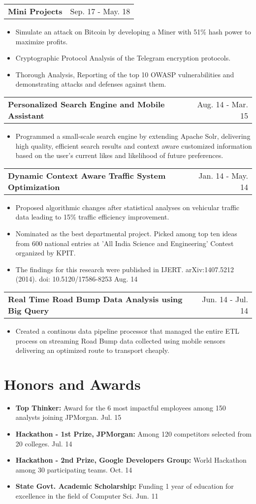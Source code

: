 \documentclass[a4paper,10pt]{article}
\makeatletter
\newcommand{\projectHeading}[2]{
    \begin{tabular*}{1\textwidth}{l@{\extracolsep{\fill}}r}
      \large{\textbf{#1}} & \small{#2} 
    \end{tabular*}
}
\newcommand{\resumeItemListStart}{\begin{itemize}[topsep=2.2pt, parsep=1pt, listparindent=0pt, itemindent=0pt, itemsep=1pt, leftmargin=*]}
\newcommand{\resumeItemListEnd}{\end{itemize}}
\makeatother
\begin{document}
    \projectHeading{Mini Projects}{Sep. 17 - May. 18} 
    \resumeItemListStart
    	 \item\small{Simulate an attack on Bitcoin by developing a Miner with 51\% hash power to maximize profits.}
    	 \item\small{Cryptographic Protocol Analysis of the Telegram encryption protocols.}
    	 \item\small{Thorough Analysis, Reporting of the top 10 OWASP vulnerabilities and demonstrating attacks and defenses against them.}
    \resumeItemListEnd
    
   \projectHeading{Personalized Search Engine and Mobile Assistant}{Aug. 14 - Mar. 15} 
    \resumeItemListStart
       \item\small{Programmed a small-scale search engine by extending Apache Solr, delivering high quality, efficient search results and context aware customized information based on the user's current likes and likelihood of future preferences.}
     \resumeItemListEnd
   
   \projectHeading{Dynamic Context Aware Traffic System Optimization}{Jan. 14 - May. 14} 
    \resumeItemListStart
       \item\small{Proposed algorithmic changes after statistical analyses on vehicular traffic data leading to 15\% traffic efficiency improvement.}
       \item\small{Nominated as the best departmental project. Picked among top ten ideas from 600 national entries at 'All India Science and Engineering' Contest organized by KPIT.}
       \item\small{The findings for this research were published in IJERT. arXiv:1407.5212 (2014). doi: 10.5120/17586-8253 Aug. 14}
     \resumeItemListEnd

   \projectHeading{Real Time Road Bump Data Analysis using Big Query}{Jun. 14 - Jul. 14} 
   \resumeItemListStart
      \item\small{Created a continous data pipeline processor that managed the entire ETL process on streaming Road Bump data collected using mobile sensors delivering an optimized route to transport cheaply.}
   \resumeItemListEnd
   
 
\section{Honors and Awards}
  \resumeItemListStart
    \item\small{\textbf{Top Thinker: }
      {Award for the 6 most impactful employees among 150 analysts joining JPMorgan.}\hfill{} {Jul. 15}}
    \item\small{\textbf{Hackathon - 1st Prize, JPMorgan: }
      {Among 120 competitors selected from 20 colleges.}\hfill{} {Jul. 14}}
    \item\small{\textbf{Hackathon - 2nd Prize, Google Developers Group: }
      {World Hackathon among 30 participating teams.}\hfill{} {Oct. 14}}
    \item\small{\textbf{State Govt. Academic Scholarship: }
    {Funding 1 year of education for excellence in the field of Computer Sci.}\hfill{} {Jun. 11}}
  \resumeItemListEnd
\end{document}
